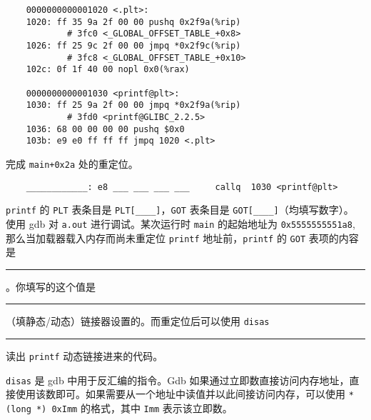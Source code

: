\begin{problems}
\begin{verbatim}
    0000000000001020 <.plt>:
    1020: ff 35 9a 2f 00 00 pushq 0x2f9a(%rip)
            # 3fc0 <_GLOBAL_OFFSET_TABLE_+0x8>
    1026: ff 25 9c 2f 00 00 jmpq *0x2f9c(%rip)
            # 3fc8 <_GLOBAL_OFFSET_TABLE_+0x10>
    102c: 0f 1f 40 00 nopl 0x0(%rax)

    0000000000001030 <printf@plt>:
    1030: ff 25 9a 2f 00 00 jmpq *0x2f9a(%rip)
            # 3fd0 <printf@GLIBC_2.2.5>
    1036: 68 00 00 00 00 pushq $0x0
    103b: e9 e0 ff ff ff jmpq 1020 <.plt>
        \end{verbatim}
            \subqn 完成 \verb|main+0x2a| 处的重定位。
            \begin{verbatim}
    ____________: e8 ___ ___ ___ ___     callq  1030 <printf@plt>
            \end{verbatim}
            \subqn \verb|printf| 的 \verb|PLT| 表条目是 \verb|PLT[____]|，\verb|GOT| 表条目是 \verb|GOT[____]|（均填写数字）。
            \subqn 使用 gdb 对 \verb|a.out| 进行调试。某次运行时 \verb|main| 的起始地址为 \verb|0x5555555551a8|, 那么当加载器载入内存而尚未重定位 \verb|printf| 地址前，\verb|printf| 的 \verb|GOT| 表项的内容是 \rule{2.5cm}{0.25mm}。你填写的这个值是 \rule{2.5cm}{0.25mm}（填静态/动态）链接器设置的。而重定位后可以使用 \verb|disas| \rule{2.5cm}{0.25mm} 读出 \verb|printf| 动态链接进来的代码。
            \begin{hint}
                \verb|disas| 是 gdb 中用于反汇编的指令。Gdb 如果通过立即数直接访问内存地址，直接使用该数即可。如果需要从一个地址中读值并以此间接访问内存，可以使用 \verb|*(long *) 0xImm| 的格式，其中 \verb|Imm| 表示该立即数。
            \end{hint}
    \end{problems}

